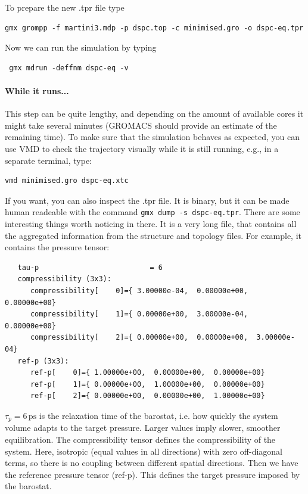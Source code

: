To prepare the new .tpr file type
\begin{verbatim}
gmx grompp -f martini3.mdp -p dspc.top -c minimised.gro -o dspc-eq.tpr
\end{verbatim}


Now we can run the simulation by typing
\begin{verbatim}
 gmx mdrun -deffnm dspc-eq -v
\end{verbatim}

\paragraph{While it runs...}
This step can be quite lengthy, and depending on the amount of available cores it might take several minutes (GROMACS should provide an estimate of the remaining time). To make sure that the simulation behaves as expected, you can use VMD to check the trajectory visually while it is still running, e.g., in a separate terminal, type:
\begin{verbatim}
vmd minimised.gro dspc-eq.xtc
\end{verbatim}
If you want, you can also inspect the .tpr file. It is binary, but it can be made human
readeable with the command \texttt{gmx dump -s dspc-eq.tpr}. There are some interesting things
worth noticing in there. It is a very long file, that contains all the aggregated information from the
structure and topology files. For example, it contains the pressure tensor:


{
  \small 
\begin{verbatim}
   tau-p                          = 6
   compressibility (3x3):
      compressibility[    0]={ 3.00000e-04,  0.00000e+00,  0.00000e+00}
      compressibility[    1]={ 0.00000e+00,  3.00000e-04,  0.00000e+00}
      compressibility[    2]={ 0.00000e+00,  0.00000e+00,  3.00000e-04}
   ref-p (3x3):
      ref-p[    0]={ 1.00000e+00,  0.00000e+00,  0.00000e+00}
      ref-p[    1]={ 0.00000e+00,  1.00000e+00,  0.00000e+00}
      ref-p[    2]={ 0.00000e+00,  0.00000e+00,  1.00000e+00}
\end{verbatim}
}
$\tau_p = 6\,\mathrm{ps}$ is the relaxation time of the barostat, i.e.
 how quickly the system volume adapts to the target pressure. Larger values imply slower, smoother equilibration.
The compressibility tensor defines the compressibility of the system. Here, isotropic (equal values in all directions)
with zero off-diagonal terms, so there is no coupling between different spatial directions.
Then we have the reference pressure tensor (ref-p). This defines the target pressure imposed by the barostat.


